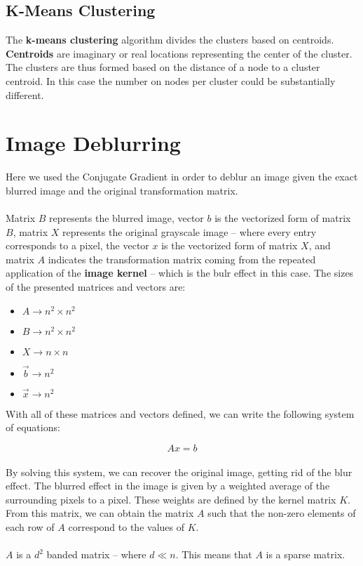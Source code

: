 \documentclass{article}
\begin{document}
\subsection{K-Means Clustering}
The \textbf{k-means clustering} algorithm divides the clusters based on centroids. \textbf{Centroids} are imaginary or real locations representing the center of the cluster. The clusters are thus formed based on the distance of a node to a cluster centroid. In this case the number on nodes per cluster could be substantially different.

\section{Image Deblurring}
Here we used the Conjugate Gradient in order to deblur an image given the exact blurred image and the original transformation matrix. \\ \\
Matrix $B$ represents the blurred image, vector $b$ is the vectorized form of matrix $B$, matrix $X$ represents the original grayscale image -- where every entry corresponds to a pixel, the vector $x$ is the vectorized form of matrix $X$, and matrix $A$ indicates the transformation matrix coming from the repeated application of the \textbf{image kernel} -- which is the bulr effect in this case. The sizes of the presented matrices and vectors are:

\begin{itemize}
	\item $A \rightarrow n^2 \times n^2$
	\item $B \rightarrow n^2 \times n^2$
	\item $X \rightarrow n \times n$
	\item $\overrightarrow{b} \rightarrow n^2$
	\item $\overrightarrow{x} \rightarrow n^2$
\end{itemize}
With all of these matrices and vectors defined, we can write the following system of equations:

\[ Ax = b \] \\
By solving this system, we can recover the original image, getting rid of the blur effect. The blurred effect in the image is given by a weighted average of the surrounding pixels to a pixel. These weights are defined by the kernel matrix $K$. From this matrix, we can obtain the matrix $A$ such that the non-zero elements of each row of $A$ correspond to the values of $K$. \\ \\
$A$ is a $d^2$ banded matrix -- where $d \ll n$. This means that $A$ is a sparse matrix.
\end{document}

